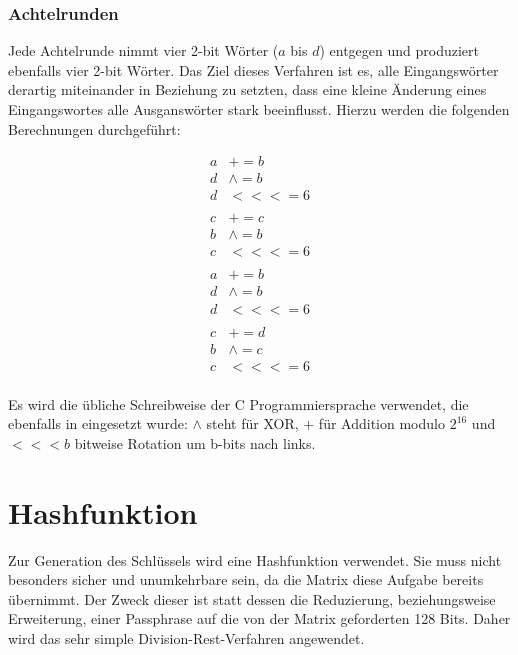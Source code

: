 \documentclass[10pt,a4paper]{article}
\begin{document}
\subsubsection{Achtelrunden}
\label{sec:Achtelrunde}

Jede Achtelrunde nimmt vier 2-bit Wörter ($a$ bis $d$) entgegen und produziert ebenfalls vier 2-bit Wörter.
Das Ziel dieses Verfahren ist es, alle Eingangswörter derartig miteinander in Beziehung zu setzten, dass eine kleine Änderung eines Eingangswortes alle Ausganswörter stark beeinflusst.
Hierzu werden die folgenden Berechnungen durchgeführt:

\begin{align*}
    a & +=       b \\
    d & \wedge = b \\
    d & <<<=     6 \\
      &            \\
    c & +=       c \\
    b & \wedge = b \\
    c & <<<=     6 \\
      &            \\
    a & +=       b \\
    d & \wedge = b \\
    d & <<<=     6 \\
      &            \\
    c & +=       d \\
    b & \wedge = c \\
    c & <<<=     6 \\
\end{align*}

Es wird die übliche Schreibweise der C Programmiersprache verwendet, die ebenfalls in \cite{Bernstein2008} eingesetzt wurde:
$\wedge$ steht für XOR, $+$ für Addition modulo $2^{16}$ und $<<<b$ bitweise Rotation um b-bits nach links.

\section{Hashfunktion}

Zur Generation des Schlüssels wird eine Hashfunktion verwendet.
Sie muss nicht besonders sicher und unumkehrbare sein, da die Matrix diese Aufgabe bereits übernimmt.
Der Zweck dieser ist statt dessen die Reduzierung, beziehungsweise Erweiterung, einer Passphrase auf die von der Matrix geforderten 128 Bits.
Daher wird das sehr simple Division-Rest-Verfahren angewendet.
\end{document}
